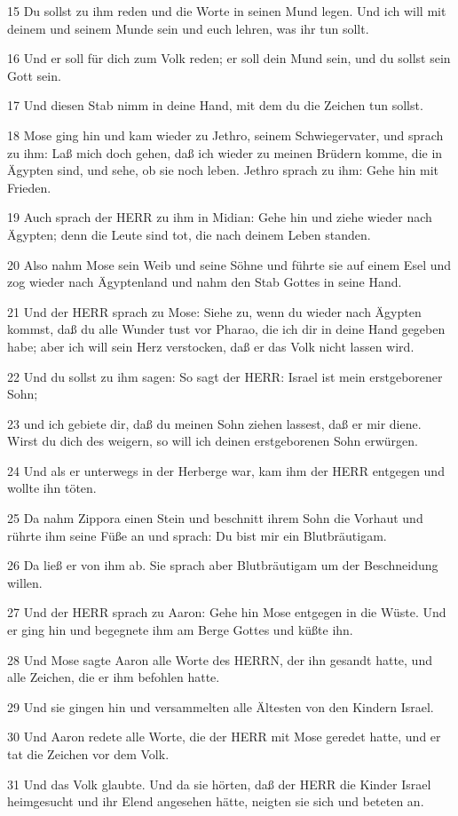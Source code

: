 \par 15 Du sollst zu ihm reden und die Worte in seinen Mund legen. Und ich will mit deinem und seinem Munde sein und euch lehren, was ihr tun sollt.
\par 16 Und er soll für dich zum Volk reden; er soll dein Mund sein, und du sollst sein Gott sein.
\par 17 Und diesen Stab nimm in deine Hand, mit dem du die Zeichen tun sollst.
\par 18 Mose ging hin und kam wieder zu Jethro, seinem Schwiegervater, und sprach zu ihm: Laß mich doch gehen, daß ich wieder zu meinen Brüdern komme, die in Ägypten sind, und sehe, ob sie noch leben. Jethro sprach zu ihm: Gehe hin mit Frieden.
\par 19 Auch sprach der HERR zu ihm in Midian: Gehe hin und ziehe wieder nach Ägypten; denn die Leute sind tot, die nach deinem Leben standen.
\par 20 Also nahm Mose sein Weib und seine Söhne und führte sie auf einem Esel und zog wieder nach Ägyptenland und nahm den Stab Gottes in seine Hand.
\par 21 Und der HERR sprach zu Mose: Siehe zu, wenn du wieder nach Ägypten kommst, daß du alle Wunder tust vor Pharao, die ich dir in deine Hand gegeben habe; aber ich will sein Herz verstocken, daß er das Volk nicht lassen wird.
\par 22 Und du sollst zu ihm sagen: So sagt der HERR: Israel ist mein erstgeborener Sohn;
\par 23 und ich gebiete dir, daß du meinen Sohn ziehen lassest, daß er mir diene. Wirst du dich des weigern, so will ich deinen erstgeborenen Sohn erwürgen.
\par 24 Und als er unterwegs in der Herberge war, kam ihm der HERR entgegen und wollte ihn töten.
\par 25 Da nahm Zippora einen Stein und beschnitt ihrem Sohn die Vorhaut und rührte ihm seine Füße an und sprach: Du bist mir ein Blutbräutigam.
\par 26 Da ließ er von ihm ab. Sie sprach aber Blutbräutigam um der Beschneidung willen.
\par 27 Und der HERR sprach zu Aaron: Gehe hin Mose entgegen in die Wüste. Und er ging hin und begegnete ihm am Berge Gottes und küßte ihn.
\par 28 Und Mose sagte Aaron alle Worte des HERRN, der ihn gesandt hatte, und alle Zeichen, die er ihm befohlen hatte.
\par 29 Und sie gingen hin und versammelten alle Ältesten von den Kindern Israel.
\par 30 Und Aaron redete alle Worte, die der HERR mit Mose geredet hatte, und er tat die Zeichen vor dem Volk.
\par 31 Und das Volk glaubte. Und da sie hörten, daß der HERR die Kinder Israel heimgesucht und ihr Elend angesehen hätte, neigten sie sich und beteten an.

